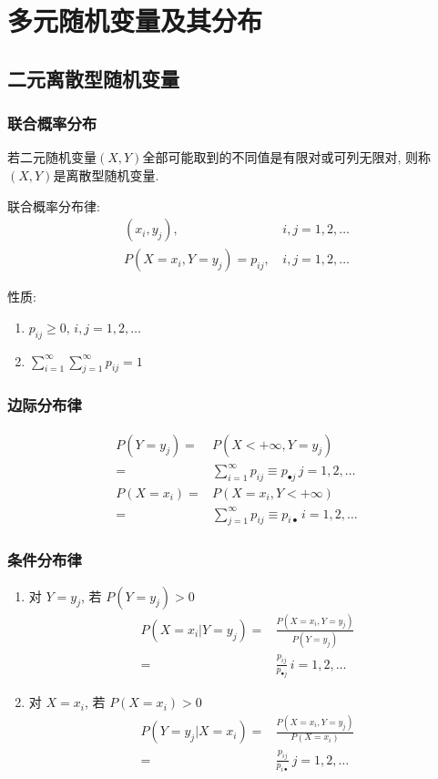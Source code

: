 \newpage
\section{多元随机变量及其分布}

\subsection{二元离散型随机变量}

\subsubsection{联合概率分布}
\begin{definition}
    若二元随机变量$(X,Y)$全部可能取到的不同值是有限对或可列无限对, 则称$(X,Y)$是离散型随机变量. 
\end{definition}

联合概率分布律: 
\begin{align*}
    (x_i,y_j),&\, i,j=1,2,\dots\\
    P(X=x_i,Y=y_j)=p_{ij},&\, i,j=1,2,\dots
\end{align*}

性质:
\begin{enumerate}
    \item $p_{ij}\ge 0,\,i,j=1,2,\dots$
    \item $\sum_{i=1}^{\infty}\sum_{j=1}^{\infty}p_{ij}=1$
\end{enumerate}

\subsubsection{边际分布律}
\begin{align*}
    P(Y=y_j)=&P(X<+\infty, Y=y_j)\\
    =&\sum_{i=1}^{\infty}p_{ij}\equiv p_{\bullet  j}\,j=1,2,\dots\\
    P(X=x_i)=&P(X=x_i, Y<+\infty)\\
    =&\sum_{j=1}^{\infty}p_{ij}\equiv p_{i\bullet }\,i=1,2,\dots
\end{align*}

\subsubsection{条件分布律}
\begin{enumerate}
    \item 对 $Y=y_j$, 若 $P(Y=y_j)>0$
    \begin{align*}
        P(X=x_i|Y=y_j)=&\frac{P(X=x_i,Y=y_j)}{P(Y=y_j)}\\
        =&\frac{p_{ij}}{p_{\bullet j}}\, i=1,2,\dots
    \end{align*}
    \item 对 $X=x_i$, 若 $P(X=x_i)>0$
    \begin{align*}
        P(Y=y_j|X=x_i)=&\frac{P(X=x_i,Y=y_j)}{P(X=x_i)}\\
        =&\frac{p_{ij}}{p_{i \bullet }}\, j=1,2,\dots
    \end{align*}
\end{enumerate}

